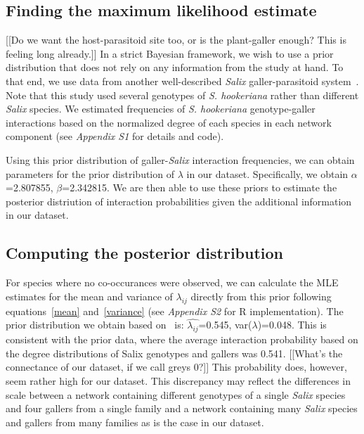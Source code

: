 ﻿\documentclass[12pt]{article}
\begin{document}
    \subsection*{Finding the maximum likelihood estimate}

      [[Do we want the host-parasitoid site too, or is the plant-galler enough? This is feeling long already.]]
      In a strict Bayesian framework, we wish to use a prior distribution that does not rely on any information from the study at hand. To that end, we use data from another well-described \emph{Salix} galler-parasitoid system~\citep{Barbour2016,Barbour2016Dryad}. Note that this study used several genotypes of \emph{S. hookeriana} rather than different \emph{Salix} species. We estimated frequencies of  \emph{S. hookeriana} genotype-galler interactions based on the normalized degree of each species in each network component (see \emph{Appendix S1} for details and code).


      Using this prior distribution of galler-\emph{Salix} interaction frequencies, we can obtain parameters for the prior distribution of $\lambda$ in our dataset. Specifically, we obtain $\alpha$=2.807855, $\beta$=2.342815. We are then able to use these priors to estimate the posterior distriution of interaction probabilities given the additional information in our dataset.


    \subsection*{Computing the posterior distribution}

      For species where no co-occurances were observed, we can 
      calculate the MLE estimates for the mean and variance of 
      $\lambda_{ij}$ directly from this prior following 
      equations~\ref{mean} and~\ref{variance} 
      (see \emph{Appendix S2} for R implementation). The prior 
      distribution we obtain based on~\citet{Barbour2016,Barbour2016Dryad} is:
      $\hat{\lambda_{ij}}$=0.545, var($\lambda$)=0.048.
      This is consistent with the prior data, where the average 
      interaction probability based on the degree distributions of Salix genotypes and gallers was 0.541. [[What's the connectance of our dataset, if we call greys 0?]] This probability does, however, seem rather high for our dataset. This discrepancy may reflect the differences in scale between a network containing different genotypes of a single \emph{Salix} species and four gallers from a single family and a network containing many \emph{Salix} species and gallers from many families as is the case in our dataset.
\end{document}
